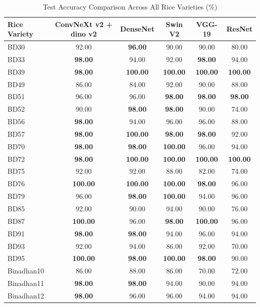 \documentclass[11pt,a4paper]{article}
\begin{document}
\begin{table}[H]
\centering
\caption{Test Accuracy Comparison Across All Rice Varieties (\%)}
\label{tab:classwise}
\small
\begin{tabular}{lccccc}
\toprule
\textbf{Rice Variety} & \textbf{ConvNeXt v2 + dino v2} & \textbf{DenseNet} & \textbf{Swin V2} & \textbf{VGG-19} & \textbf{ResNet} \\
\midrule
BD30 & 92.00 & \textbf{96.00} & 90.00 & 90.00 & 80.00 \\
BD33 & \textbf{98.00} & 94.00 & 92.00 & \textbf{98.00} & 94.00 \\
BD39 & \textbf{98.00} & \textbf{100.00} & \textbf{100.00} & \textbf{100.00} & \textbf{100.00} \\
BD49 & 86.00 & 84.00 & 92.00 & 90.00 & 88.00 \\
BD51 & 96.00 & 96.00 & \textbf{98.00} & \textbf{98.00} & \textbf{98.00} \\
BD52 & 90.00 & \textbf{98.00} & \textbf{98.00} & 90.00 & 74.00 \\
BD56 & \textbf{98.00} & 94.00 & 96.00 & 96.00 & 88.00 \\
BD57 & \textbf{98.00} & \textbf{100.00} & \textbf{98.00} & \textbf{98.00} & 92.00 \\
BD70 & \textbf{98.00} & \textbf{98.00} & \textbf{100.00} & 96.00 & 94.00 \\
BD72 & \textbf{98.00} & \textbf{100.00} & \textbf{100.00} & \textbf{100.00} & \textbf{100.00} \\
BD75 & 92.00 & 92.00 & 88.00 & 82.00 & 74.00 \\
BD76 & \textbf{100.00} & \textbf{100.00} & \textbf{100.00} & \textbf{98.00} & 96.00 \\
BD79 & 96.00 & \textbf{98.00} & \textbf{100.00} & 94.00 & 96.00 \\
BD85 & 92.00 & 90.00 & 94.00 & 90.00 & 76.00 \\
BD87 & \textbf{100.00} & 96.00 & \textbf{98.00} & \textbf{100.00} & 96.00 \\
BD91 & \textbf{98.00} & \textbf{98.00} & 94.00 & 96.00 & 94.00 \\
BD93 & 92.00 & 94.00 & 86.00 & 92.00 & 70.00 \\
BD95 & \textbf{100.00} & \textbf{98.00} & \textbf{100.00} & \textbf{98.00} & 90.00 \\
Binadhan10 & 86.00 & 88.00 & 86.00 & 70.00 & 72.00 \\
Binadhan11 & \textbf{98.00} & \textbf{98.00} & 94.00 & 90.00 & 94.00 \\
Binadhan12 & \textbf{98.00} & 96.00 & 96.00 & 94.00 & 94.00 \\

\end{tabular}
\end{table}
\end{document}

